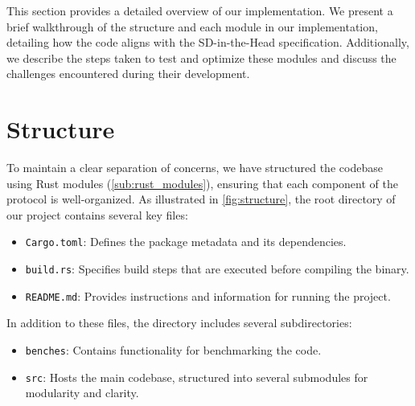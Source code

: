 \documentclass[11pt]{report}
\theoremstyle{definition}
\theoremstyle{plain}
\begin{document}
This section provides a detailed overview of our implementation. We present a brief walkthrough of the structure and each module in our implementation, detailing how the code aligns with the SD-in-the-Head specification. Additionally, we describe the steps taken to test and optimize these modules and discuss the challenges encountered during their development.



\section{Structure}
To maintain a clear separation of concerns, we have structured the codebase using Rust modules (\autoref{sub:rust_modules}), ensuring that each component of the protocol is well-organized. As illustrated in \autoref{fig:structure}, the root directory of our project contains several key files:

\begin{itemize}
  \item \texttt{Cargo.toml}: Defines the package metadata and its dependencies.
  \item \texttt{build.rs}: Specifies build steps that are executed before compiling the binary.
  \item \texttt{README.md}: Provides instructions and information for running the project.
\end{itemize}

In addition to these files, the directory includes several subdirectories:

\begin{itemize}
  \item \texttt{benches}: Contains functionality for benchmarking the code.
  \item \texttt{src}: Hosts the main codebase, structured into several submodules for modularity and clarity.
\end{itemize}
\end{document}
